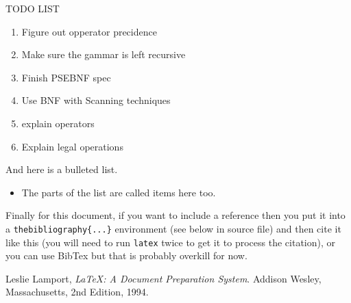 \documentclass[a4wide, 11pt]{article}
\begin{document}
TODO LIST

\begin{enumerate}

    \item
    Figure out opperator precidence
    
    \item
    Make sure the gammar is left recursive
    
    \item
    Finish PSEBNF spec

    \item
    Use BNF with Scanning techniques 
    
    \item
     explain operators

    \item
    Explain legal operations    
    
    
\end{enumerate}

And here is a bulleted list.

\begin{itemize}

    \item
    The parts of the list are called items here too.
    
\end{itemize}

Finally for this document, if you want to include a reference
then you put it into a \texttt{thebibliography\{...\}}
environment (see below in source file) and then 
cite it like this \cite{lamport94}
(you will need to run \texttt{latex} twice to get it to process the citation),
or you can use BibTex but that is probably overkill for now.

\begin{thebibliography}{9}

  Leslie Lamport,
  \emph{\LaTeX: A Document Preparation System}.
  Addison Wesley, Massachusetts,
  2nd Edition,
  1994.
 

\end{thebibliography}
\end{document}
